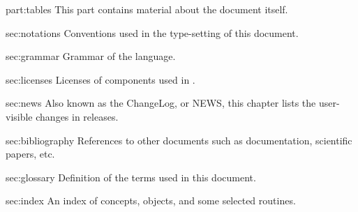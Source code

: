 
\begin{partDescription}{part:tables}
  {
    This part contains material about the document itself.
  }

\item[sec:notations]
  Conventions used in the type-setting of this document.

\item[sec:grammar]
  Grammar of the \us language.

\item[sec:licenses]
  Licenses of components used in \usdk.

\item[sec:news] Also known as the \urbi ChangeLog, or \urbi NEWS, this
  chapter lists the user-visible changes in \usdk releases.

\item[sec:bibliography] References to other documents such as documentation,
  scientific papers, etc.

\item[sec:glossary]
  Definition of the terms used in this document.

\item[sec:index]
  An index of concepts, objects, and some selected routines.
\end{partDescription}


